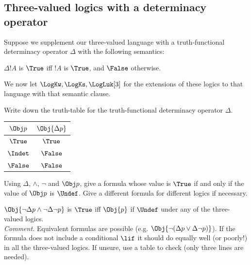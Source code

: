 \documentclass[../../../../include/open-logic-section]{subfiles}
\begin{document}


\subsection{Three-valued logics with a determinacy operator}

Suppose we supplement our three-valued language with a truth-functional
determinacy operator $\Delta$ with the following semantics: 

\begin{defn}
 $\Delta !A$ is $\True$ iff $!A$ is $\True$, and $\False$ otherwise. 
\end{defn}

We now let $\LogKw, \LogKs, \LogLuk[3]$ for the extensions of these
logics to that language with that semantic clause. 

\begin{prob}
Write down the truth-table for the truth-functional determinacy operator
$\Delta$. 
\begin{ans}
\begin{center}
	\begin{tabular}{|c|c|}
	\hline
	$\Obj p$ 	&	$\Obj{\Delta p}$\\
	\hline
	$\True$		&	$\True$ \\
	$\Indet$	&	$\False$ \\
	$\False$	&	$\False$ \\
	\hline
	\end{tabular}
\end{center}
\end{ans}
\end{prob}

\begin{prob}
Using $\Delta$, $\land$, $\lnot$ and $\Obj p$, give a formula
whose value is $\True$ if and only if the value of $\Obj p$ is $\Undef$. 
Give a different formula for different logics if necessary.
\begin{ans}
$\Obj{\lnot \Delta p \land \lnot \Delta \lnot p}$ is $\True$ iff $\Obj{p}$
if $\Undef$ under any of the three-valued logics.\\
\emph{Comment.} Equivalent formulas are possible (e.g. $\Obj{\lnot (\Delta p \lor \Delta \lnot p)}$). If the formula does not include a conditional $\lif$ it should do equally well (or poorly!)
in all the three-valued logics. If unsure, use a table to check (only three lines are needed).
\end{ans}
\end{prob}
\end{document}
